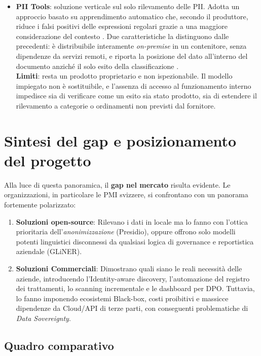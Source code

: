 \begin{itemize}
	\item \textbf{PII Tools}: soluzione verticale sul solo rilevamento delle PII. Adotta un approccio basato su apprendimento automatico che, secondo il produttore, riduce i falsi positivi delle espressioni regolari grazie a una maggiore considerazione del contesto \cite{PIIToolsPDFPII}. Due caratteristiche la distinguono dalle precedenti: è distribuibile interamente \textit{on-premise} in un contenitore, senza dipendenze da servizi remoti, e riporta la posizione del dato all'interno del documento anziché il solo esito della classificazione \cite{PIIToolsDiscover}. \\
	      \textbf{Limiti}: resta un prodotto proprietario e non ispezionabile. Il modello impiegato non è sostituibile, e l'assenza di accesso al funzionamento interno impedisce sia di verificare come un esito sia stato prodotto, sia di estendere il rilevamento a categorie o ordinamenti non previsti dal fornitore.
\end{itemize}

\section{Sintesi del gap e posizionamento del progetto} %
\label{sec:sintesi-gap}
Alla luce di questa panoramica, il \textbf{gap nel mercato} risulta evidente. Le organizzazioni, in particolare le PMI svizzere, si confrontano con un panorama fortemente polarizzato:

\begin{enumerate}
	\item \textbf{Soluzioni open-source}: Rilevano i dati in locale ma lo fanno con l'ottica prioritaria dell'\textit{anonimizzazione} (Presidio), oppure offrono solo modelli potenti linguistici disconnessi da qualsiasi logica di governance e reportistica aziendale (GLiNER).
	\item \textbf{Soluzioni Commerciali}: Dimostrano quali siano le reali necessità delle aziende, introducendo l'Identity-aware discovery, l'automazione del registro dei trattamenti, lo scanning incrementale e le dashboard per DPO. Tuttavia, lo fanno imponendo ecosistemi Black-box, costi proibitivi e massicce dipendenze da Cloud/API di terze parti, con conseguenti problematiche di \textit{Data Sovereignty}.
\end{enumerate}

\subsection{Quadro comparativo}
\label{sub:quadro-comparativo}


